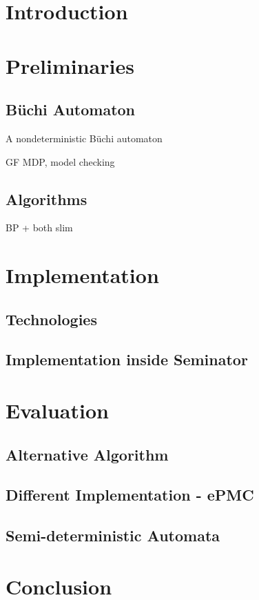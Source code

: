 \documentclass{fithesis3}
\begin{document}
	\chapter{Introduction}
	\chapter{Preliminaries}
		\section{Büchi Automaton}
		A nondeterministic Büchi automaton
		
		GF MDP, model checking
		\section{Algorithms}
		BP + both slim 
	\chapter{Implementation}
		\section{Technologies}
		\section{Implementation inside Seminator}
	\chapter{Evaluation}
		\section{Alternative Algorithm}
		\section{Different Implementation - ePMC}
		\section{Semi-deterministic Automata}
	\chapter{Conclusion}
\end{document}
